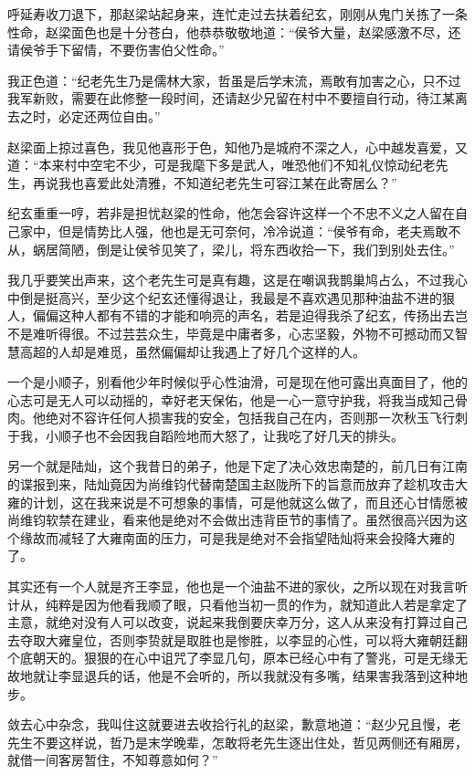 呼延寿收刀退下，那赵梁站起身来，连忙走过去扶着纪玄，刚刚从鬼门关拣了一条性命，赵梁面色也是十分苍白，他恭恭敬敬地道：“侯爷大量，赵梁感激不尽，还请侯爷手下留情，不要伤害伯父性命。”

我正色道：“纪老先生乃是儒林大家，哲虽是后学末流，焉敢有加害之心，只不过我军新败，需要在此修整一段时间，还请赵少兄留在村中不要擅自行动，待江某离去之时，必定还两位自由。”

赵梁面上掠过喜色，我见他喜形于色，知他乃是城府不深之人，心中越发喜爱，又道：“本来村中空宅不少，可是我麾下多是武人，唯恐他们不知礼仪惊动纪老先生，再说我也喜爱此处清雅，不知道纪老先生可容江某在此寄居么？”

纪玄重重一哼，若非是担忧赵梁的性命，他怎会容许这样一个不忠不义之人留在自己家中，但是情势比人强，他也是无可奈何，冷冷说道：“侯爷有命，老夫焉敢不从，蜗居简陋，倒是让侯爷见笑了，梁儿，将东西收拾一下，我们到别处去住。”

我几乎要笑出声来，这个老先生可是真有趣，这是在嘲讽我鹊巢鸠占么，不过我心中倒是挺高兴，至少这个纪玄还懂得退让，我最是不喜欢遇见那种油盐不进的狠人，偏偏这种人都有不错的才能和响亮的声名，若是迫得我杀了纪玄，传扬出去岂不是难听得很。不过芸芸众生，毕竟是中庸者多，心志坚毅，外物不可撼动而又智慧高超的人却是难觅，虽然偏偏却让我遇上了好几个这样的人。

一个是小顺子，别看他少年时候似乎心性油滑，可是现在他可露出真面目了，他的心志可是无人可以动摇的，幸好老天保佑，他是一心一意守护我，将我当成知己骨肉。他绝对不容许任何人损害我的安全，包括我自己在内，否则那一次秋玉飞行刺于我，小顺子也不会因我自蹈险地而大怒了，让我吃了好几天的排头。

另一个就是陆灿，这个我昔日的弟子，他是下定了决心效忠南楚的，前几日有江南的谍报到来，陆灿竟因为尚维钧代替南楚国主赵陇所下的旨意而放弃了趁机攻击大雍的计划，这在我来说是不可想象的事情，可是他就这么做了，而且还心甘情愿被尚维钧软禁在建业，看来他是绝对不会做出违背臣节的事情了。虽然很高兴因为这个缘故而减轻了大雍南面的压力，可是我是绝对不会指望陆灿将来会投降大雍的了。

其实还有一个人就是齐王李显，他也是一个油盐不进的家伙，之所以现在对我言听计从，纯粹是因为他看我顺了眼，只看他当初一贯的作为，就知道此人若是拿定了主意，就绝对没有人可以改变，说起来我倒要庆幸万分，这人从来没有打算过自己去夺取大雍皇位，否则李贽就是取胜也是惨胜，以李显的心性，可以将大雍朝廷翻个底朝天的。狠狠的在心中诅咒了李显几句，原本已经心中有了警兆，可是无缘无故地就让李显退兵的话，他是不会听的，所以我就没有多嘴，结果害我落到这种地步。

敛去心中杂念，我叫住这就要进去收拾行礼的赵梁，歉意地道：“赵少兄且慢，老先生不要这样说，哲乃是末学晚辈，怎敢将老先生逐出住处，哲见两侧还有厢房，就借一间客房暂住，不知尊意如何？”

